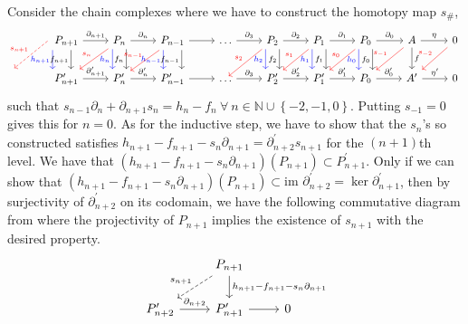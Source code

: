 \documentclass[a4paper,11pt, tikz]{article}
\newcommand{\lb}{\left(}
\newcommand{\rb}{\right)}
\newcommand{\lc}{\left\lbrace}
\newcommand{\rc}{\right\rbrace}
\newcommand{\dash}{^\prime}
\newcommand{\naturals}{\mathbb{N}}
\newcommand{\y}{\eta}
\newcommand{\dl}{\partial}
\newcommand{\im}{\text{im~}}
\begin{document}
Consider the chain complexes where we have to construct the homotopy map $s_\#$,
\begin{equation*}
\begin{tikzcd}
{} &P_{n+1}\ar[r, "\dl_{n+1}"]\ar[d, "h_{n+1}"', shift right=3ex, blue] \ar[d, "f_{n+1}"', shift left=1ex, black] \ar[dl, "s_{n+1}"', red, shift right =2.5ex, dashrightarrow] & P_n\ar[r, "\dl_n"]\ar[d, "h_{n}"', shift right=1.5ex, blue] \ar[d, "f_{n}"', shift left=1.5ex, black] \ar[dl, "s_{n}"', red]  & P_{n-1}\ar[r]\ar[d, "h_{n-1}"', shift right=2ex, blue] \ar[dl, "s_{n-1}"', red] \ar[d, "f_{n-1}"', shift left=2ex, black]  & \dots \ar[r, "\dl_3"] &P_2\arrow[r, "\dl_2"] \ar[d, "h_{2}"', shift right=1.5ex, blue] \ar[d, "f_{2}"', shift left=1.5ex, black] \ar[dl, "s_{2}"', red] &P_1\arrow[r, "\dl_1"] \ar[d, "h_{1}"', shift right=1.5ex, blue] \ar[dl, "s_{1}"', red] \ar[d, "f_{1}"', shift left=1.5ex, black] &P_0\arrow[r, "\dl_0"] \ar[d, "h_{0}"', shift right=1.5ex, blue] \ar[dl, "s_{0}"', red]\ar[d, "f_{0}"', shift left=1.5ex, black] & A\ar[r, "\y"] \ar[dl, "s_{-1}"', red] \ar[d, "f"]& 0 \ar[dl, "s_{-2}"', red]\\
{} &P_{n+1}\dash\ar[r, "\dl_{n+1}\dash"] & P_n\dash\ar[r, "\dl_n\dash"] & P_{n-1}\dash\ar[r] & \dots \ar[r, "\dl_3"] &P_2\dash\arrow[r, "\dl_2\dash"]  &P_1\dash\arrow[r, "\dl_1\dash"]&P_0\arrow[r, "\dl_0\dash"] & A\dash\ar[r, "\y\dash"]& 0
\end{tikzcd}
\end{equation*}
such that $s_{n-1}\dl_n+\dl_{n+1}s_n=h_n-f_n~\forall~n\in\naturals\cup\lc -2, -1, 0\rc$. Putting $s_{-1}=0$ gives this for $n=0$. As for the inductive step, we have to show that the $s_n$'s so constructed satisfies $h_{n+1}-f_{n+1}-s_n\dl_{n+1}=\dl_{n+2}\dash s_{n+1}$ for the $(n+1)$th level. We have that $\lb h_{n+1}-f_{n+1}-s_n\dl_{n+1}\rb\lb P_{n+1}\rb\subset P_{n+1}\dash$. Only if we can show that $\lb h_{n+1}-f_{n+1}-s_n\dl_{n+1}\rb\lb P_{n+1}\rb\subset \im\dl_{n+2}\dash=\ker\dl_{n+1}\dash$, then by surjectivity of $\dl_{n+2}\dash$ on its codomain, we have the following commutative diagram from where the projectivity of $P_{n+1}$ implies the existence of $s_{n+1}$ with the desired property.
\begin{equation*}
\begin{tikzcd}
& P_{n+1}\ar[dl, dashrightarrow, "s_{n+1}"'] \ar[d, "h_{n+1}-f_{n+1}-s_n\dl_{n+1}"] &\\
P_{n+2}\dash\ar[r, "\dl_{n+2}"] & P_{n+1}\dash\ar[r]& 0
\end{tikzcd}
\end{equation*}
\end{document}
